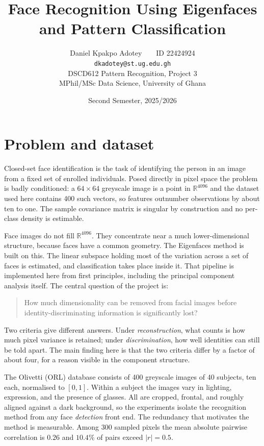\documentclass[10pt,a4paper]{article}
\title{\vspace{-1.4cm}Face Recognition Using Eigenfaces\\and Pattern Classification}
\author{Daniel Kpakpo Adotey~~\textbar~~ID 22424924\\
\texttt{dkadotey@st.ug.edu.gh}\\[0.35em]
DSCD612 Pattern Recognition, Project 3\\
MPhil/MSc Data Science, University of Ghana}
\date{Second Semester, 2025/2026}
\begin{document}
\maketitle
\vspace{-0.7cm}

\section{Problem and dataset}

Closed-set face identification is the task of identifying the person in an
image from a fixed set of enrolled individuals. Posed directly in pixel space the problem is badly conditioned:
a $64\times64$ greyscale image is a point in $\mathbb{R}^{4096}$ and the dataset
used here contains 400 such vectors, so features outnumber observations by about
ten to one. The sample covariance matrix is singular by construction and no
per-class density is estimable.

Face images do not fill $\mathbb{R}^{4096}$. They concentrate near a much
lower-dimensional structure, because faces have a common geometry. The
Eigenfaces method \citep{turk1991} is built on this. The linear subspace
holding most of the variation across a set of faces is estimated, and
classification takes place inside it. That pipeline is implemented here from
first principles, including the principal component analysis itself. The
central question of the project is:

\begin{quote}
How much dimensionality can be removed from facial images before
identity-discriminating information is significantly lost?
\end{quote}

Two criteria give different answers. Under \emph{reconstruction}, what counts
is how much pixel variance is retained; under \emph{discrimination}, how well
identities can still be told apart. The main finding here is that the two
criteria differ by a factor of about four, for a reason visible in the
component structure.

The Olivetti (ORL) database \citep{samaria1994} consists of 400 greyscale images
of 40 subjects, ten each, normalised to $[0,1]$. Within a subject the images
vary in lighting, expression, and the presence of glasses. All are cropped,
frontal, and roughly aligned against a dark background, so the experiments
isolate the recognition method from any face \emph{detection} front end. The
redundancy that motivates the method is measurable. Among 300 sampled pixels
the mean absolute pairwise correlation is $0.26$ and $10.4\%$ of pairs exceed
$|r|=0.5$.
\end{document}
